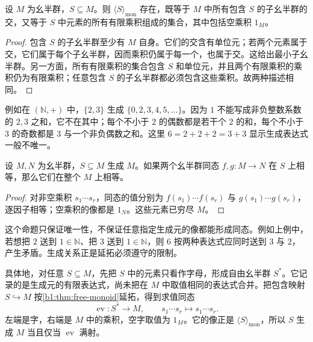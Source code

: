 
\begin{proposition}\label{b1:prop:generated-monoid}
	设 \(M\) 为幺半群，\(S\subseteq M\)。则 \(\langle S\rangle_{\mathrm{mon}}\) 存在，既等于 \(M\) 中所有包含 \(S\) 的子幺半群的交，又等于 \(S\) 中元素的所有有限乘积组成的集合，其中包括空乘积 \(1_M\)。
\end{proposition}

\begin{proof}
	包含 \(S\) 的子幺半群至少有 \(M\) 自身。它们的交含有单位元；若两个元素属于交，它们属于每个子幺半群，因而乘积仍属于每一个，也属于交。这给出最小子幺半群。另一方面，所有有限乘积的集合包含 \(S\) 和单位元，并且两个有限乘积的乘积仍为有限乘积；任意包含 \(S\) 的子幺半群都必须包含这些乘积。故两种描述相同。
\end{proof}

例如在 \((\mathbb N,+)\) 中，\(\{2,3\}\) 生成 \(\{0,2,3,4,5,\ldots\}\)。因为 \(1\) 不能写成非负整数系数的 \(2,3\) 之和，它不在其中；每个不小于 \(2\) 的偶数都是若干个 \(2\) 的和，每个不小于 \(3\) 的奇数都是 \(3\) 与一个非负偶数之和。这里 \(6=2+2+2=3+3\) 显示生成表达式一般不唯一。

\begin{proposition}\label{b1:prop:maps-on-generators}
	设 \(M,N\) 为幺半群，\(S\subseteq M\) 生成 \(M\)。如果两个幺半群同态 \(f,g:M\rightarrow N\) 在 \(S\) 上相等，那么它们在整个 \(M\) 上相等。
\end{proposition}

\begin{proof}
	对非空乘积 \(s_1\cdots s_r\)，同态的值分别为 \(f(s_1)\cdots f(s_r)\) 与 \(g(s_1)\cdots g(s_r)\)，逐因子相等；空乘积的像都是 \(1_N\)。这些元素已穷尽 \(M\)。
\end{proof}

这个命题只保证唯一性，不保证任意指定生成元的像都能形成同态。例如上例中，若想把 \(2\) 送到 \(1\in\mathbb N\)、把 \(3\) 送到 \(1\in\mathbb N\)，则 \(6\) 按两种表达式应同时送到 \(3\) 与 \(2\)，产生矛盾。生成关系正是延拓必须遵守的限制。

\ProseParagraphBreak
具体地，对任意 \(S\subseteq M\)，先把 \(S\) 中的元素只看作字母，形成自由幺半群 \(S^*\)。它记录的是生成元的有限表达式，尚未把在 \(M\) 中取值相同的表达式合并。把包含映射 \(S\hookrightarrow M\) 按\cref{b1:thm:free-monoid}延拓，得到求值同态
\[
	\operatorname{ev}:S^*\longrightarrow M,\qquad s_1\cdots s_r\longmapsto s_1\cdots s_r.
\]
左端是字，右端是 \(M\) 中的乘积，空字取值为 \(1_M\)。它的像正是 \(\langle S\rangle_{\mathrm{mon}}\)，所以 \(S\) 生成 \(M\) 当且仅当 \(\operatorname{ev}\) 满射。

